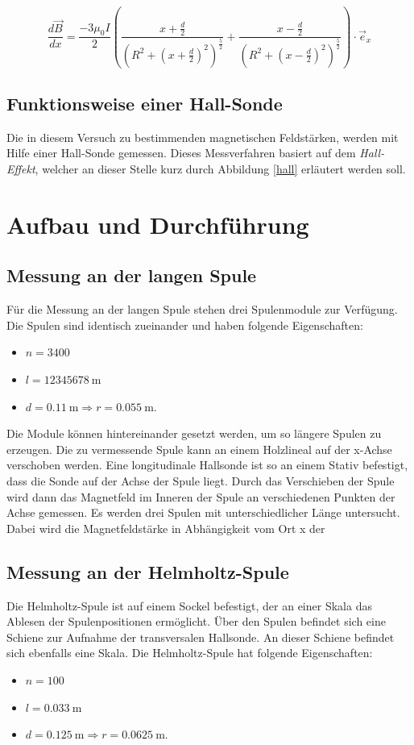 \documentclass[11pt,ngerman,a4paper]{article}
\begin{document}
\begin{equation}
\frac{d\vec B}{d x} = \frac{-3\mu_0I}{2}\left( \frac{x+\frac d2}{\left(R^2 + (x+\frac d2)^2 \right)^\frac52} + \frac{x-\frac d2}{\left(R^2 + (x-\frac d2)^2 \right)^\frac52}\right) \cdot \vec e_x
\end{equation}
\subsection{Funktionsweise einer Hall-Sonde}
Die in diesem Versuch zu bestimmenden magnetischen Feldstärken, werden mit Hilfe einer Hall-Sonde gemessen. Dieses Messverfahren basiert auf dem \textit{Hall-Effekt}, welcher an dieser Stelle kurz durch Abbildung \ref{hall} erläutert werden soll.  

\section{Aufbau und Durchführung}
\subsection{Messung an der langen Spule}
Für die Messung an der langen Spule stehen drei Spulenmodule zur Verfügung. Die Spulen sind identisch zueinander und haben folgende Eigenschaften:
\begin{itemize}
\item $n = 3400$
\item $l = \SI{12345678}{\meter}$
\item $d = \SI{0.11}{\meter} \Rightarrow r =  \SI{0.055}{\meter} $.
\end{itemize}
Die Module können hintereinander gesetzt werden, um so längere Spulen zu erzeugen. Die zu vermessende Spule kann an einem Holzlineal auf der x-Achse verschoben werden. Eine longitudinale Hallsonde ist so an einem Stativ befestigt, dass die Sonde auf der Achse der Spule liegt. Durch das Verschieben der Spule wird dann das Magnetfeld im Inneren der Spule an verschiedenen Punkten der Achse gemessen.
\newline
Es werden drei Spulen mit unterschiedlicher Länge untersucht. Dabei wird die Magnetfeldstärke in Abhängigkeit vom Ort x der 
\subsection{Messung an der Helmholtz-Spule}
Die Helmholtz-Spule ist auf einem Sockel befestigt, der an einer Skala das Ablesen der Spulenpositionen ermöglicht. Über den Spulen befindet sich eine Schiene zur Aufnahme der transversalen Hallsonde. An dieser Schiene befindet sich ebenfalls eine Skala. Die Helmholtz-Spule hat folgende Eigenschaften:
\begin{itemize}
\item $n = 100$
\item $l = \SI{0.033}{\meter}$
\item $d = \SI{0.125}{\meter} \Rightarrow r =  \SI{0.0625}{\meter} $.
\end{itemize}
\end{document}

